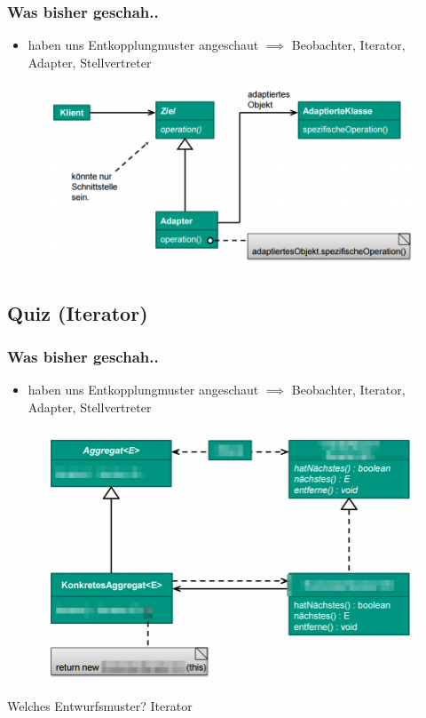 \documentclass[18pt]{beamer}
\begin{document}
	\begin{frame}
		\frametitle{Was bisher geschah..}
		\begin{itemize}
			\item haben uns Entkopplungmuster angeschaut
			\linebreak $\implies$ Beobachter, Iterator, Adapter, Stellvertreter
		\end{itemize}
		\begin{figure}
			\includegraphics[scale=0.45]{./pics/tut3/adap-obj.png}
		\end{figure}
	\end{frame}
	
	\subsection{Quiz (Iterator)}
	\begin{frame}
		\frametitle{Was bisher geschah..}
		\begin{itemize}
			\item haben uns Entkopplungmuster angeschaut
			\linebreak $\implies$ Beobachter, Iterator, Adapter, Stellvertreter
		\end{itemize}
		\begin{figure}
			\includegraphics[scale=0.25]{./pics/tut4/iter-mod.png}
		\end{figure}
		Welches Entwurfsmuster? \pause Iterator
	\end{frame}
	
\end{document}
